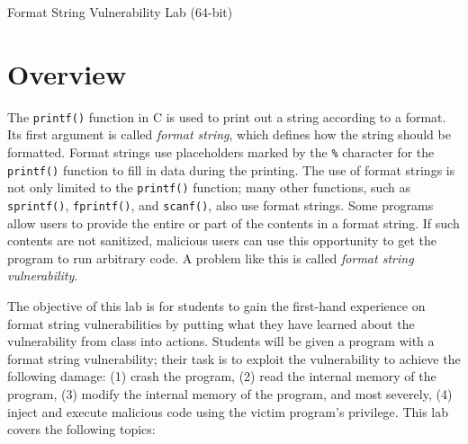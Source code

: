 




\newcommand{\formatFigs}{./Figs}
\newcommand{\dockerfile}{\texttt{Dockerfile}\xspace}







\begin{center}
{\LARGE Format String Vulnerability Lab (64-bit)}
\end{center}





\section{Overview}


The \texttt{printf()} function in C is used to print out a string according to a format.  Its
first argument is called \textit{format string}, which defines how the string should be
formatted. Format strings use placeholders marked by the \texttt{\%} character for the
\texttt{printf()} function to fill in data during the printing.  The use of format strings is
not only limited to the \texttt{printf()} function; many other functions, such as
\texttt{sprintf()}, \texttt{fprintf()}, and \texttt{scanf()}, also use format strings. Some
programs allow users to provide the entire or part of the contents in a format string. If such
contents are not sanitized, malicious users can use this opportunity to get the program to run
arbitrary code. A problem like this is called \textit{format string vulnerability}.


The objective of this lab is for students to gain the first-hand
experience on format string vulnerabilities by putting what they have learned 
about the vulnerability from class into actions. 
Students will be given a program with a format string
vulnerability; their task is to exploit
the vulnerability to achieve the following damage: (1) crash the 
program, (2) read the internal memory of the program, (3) modify
the internal memory of the program, and most severely, 
(4) inject and execute malicious code using the victim program's privilege. 
This lab covers the following topics:

